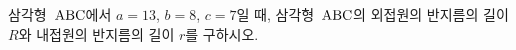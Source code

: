 삼각형~$\mathrm{ABC}$에서 $a=13$, $b=8$, $c=7$일 때, 삼각형~$\mathrm{ABC}$의 외접원의 반지름의 길이 $R$와 내접원의 반지름의 길이 $r$를 구하시오.
